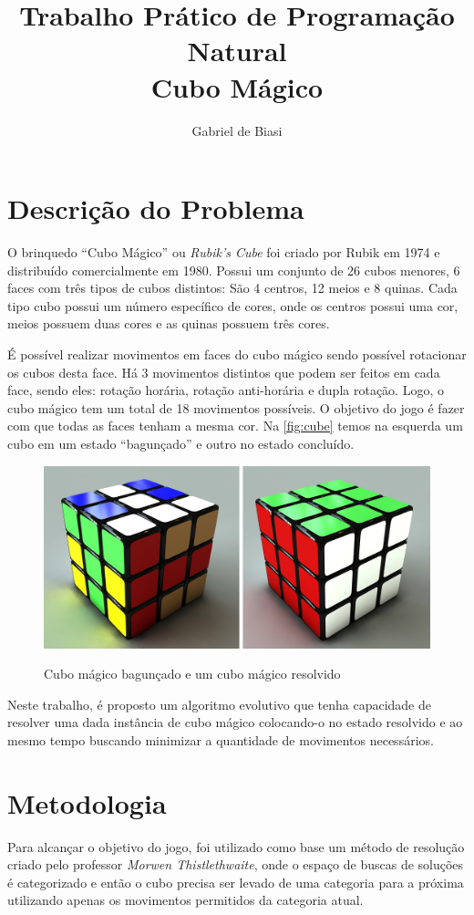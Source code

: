\documentclass[12pt]{article}
\title{Trabalho Prático de Programação Natural\\Cubo Mágico}
\author{Gabriel de Biasi\inst{1}}
\begin{document}
\maketitle

\section{Descrição do Problema}
  O brinquedo ``Cubo Mágico'' ou \textit{Rubik's Cube} foi criado por Rubik em 1974 e distribuído comercialmente em 1980. Possui um conjunto de 26 cubos menores, 6 faces com três tipos de cubos distintos: São 4 centros, 12 meios e 8 quinas. Cada tipo cubo possui um número específico de cores, onde os centros possui uma cor, meios possuem duas cores e as quinas possuem três cores.

  É possível realizar movimentos em faces do cubo mágico sendo possível rotacionar os cubos desta face. Há 3 movimentos distintos que podem ser feitos em cada face, sendo eles: rotação horária, rotação anti-horária e dupla rotação. Logo, o cubo mágico tem um total de 18 movimentos possíveis. O objetivo do jogo é fazer com que todas as faces tenham a mesma cor. Na \autoref{fig:cube} temos na esquerda um cubo em um estado ``bagunçado'' e outro no estado concluído.


  \begin{figure}[!ht]
    \centering
    \caption{Cubo mágico bagunçado e um cubo mágico resolvido}
    \includegraphics[scale=0.3]{images/cube.png}
    \label{fig:cube}
  \end{figure}

  Neste trabalho, é proposto um algoritmo evolutivo que tenha capacidade de resolver uma dada instância de cubo mágico colocando-o no estado resolvido e ao mesmo tempo buscando minimizar a quantidade de movimentos necessários.

\section{Metodologia}
  Para alcançar o objetivo do jogo, foi utilizado como base um método de resolução criado pelo professor \textit{Morwen Thistlethwaite}, onde o espaço de buscas de soluções é categorizado e então o cubo precisa ser levado de uma categoria para a próxima utilizando apenas os movimentos permitidos da categoria atual.
\end{document}
